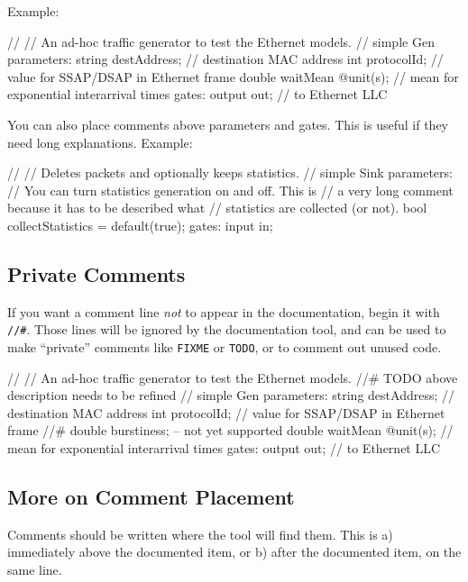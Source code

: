 Example:

\begin{ned}
//
// An ad-hoc traffic generator to test the Ethernet models.
//
simple Gen
{
    parameters:
        string destAddress;  // destination MAC address
        int protocolId;      // value for SSAP/DSAP in Ethernet frame
        double waitMean @unit(s); // mean for exponential interarrival times
    gates:
        output out;  // to Ethernet LLC
}
\end{ned}

You can also place comments above parameters and gates. This is useful
if they need long explanations. Example:

\begin{ned}
//
// Deletes packets and optionally keeps statistics.
//
simple Sink
{
    parameters:
        // You can turn statistics generation on and off. This is
        // a very long comment because it has to be described what
        // statistics are collected (or not).
        bool collectStatistics = default(true);
    gates:
        input in;
}
\end{ned}

\subsection{Private Comments}

If you want a comment line \textit{not} to appear in the documentation,
begin it with \texttt{//\#}. Those lines will be ignored by the
documentation tool, and can be used to make ``private'' comments
like \texttt{FIXME} or \texttt{TODO}, or to comment out unused code.

\begin{ned}
//
// An ad-hoc traffic generator to test the Ethernet models.
//# TODO above description needs to be refined
//
simple Gen
{
    parameters:
        string destAddress;  // destination MAC address
        int protocolId;      // value for SSAP/DSAP in Ethernet frame
        //# double burstiness;  -- not yet supported
        double waitMean @unit(s); // mean for exponential interarrival times
    gates:
        output out;  // to Ethernet LLC
}
\end{ned}


\subsection{More on Comment Placement}

Comments should be written where the tool will find them.
This is a) immediately above the documented item, or b) after the
documented item, on the same line.

